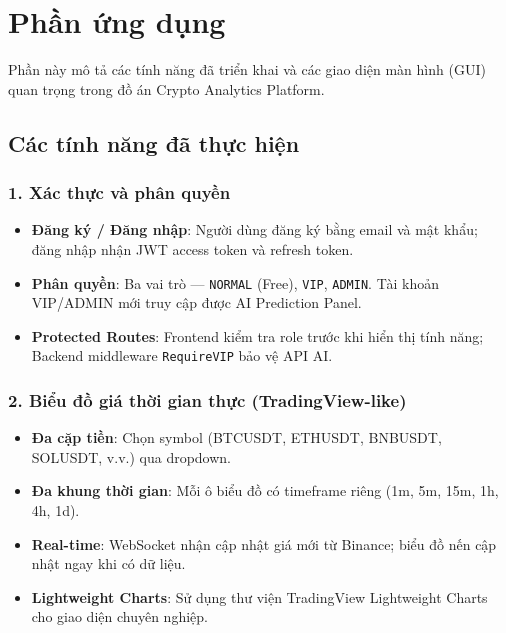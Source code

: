 
\section{Phần ứng dụng}
\label{sec:ung-dung}

Phần này mô tả các tính năng đã triển khai và các giao diện màn hình (GUI) quan trọng trong đồ án Crypto Analytics Platform.

\subsection{Các tính năng đã thực hiện}

\subsubsection{1. Xác thực và phân quyền}

\begin{itemize}
    \item \textbf{Đăng ký / Đăng nhập}: Người dùng đăng ký bằng email và mật khẩu; đăng nhập nhận JWT access token và refresh token.
    \item \textbf{Phân quyền}: Ba vai trò --- \texttt{NORMAL} (Free), \texttt{VIP}, \texttt{ADMIN}. Tài khoản VIP/ADMIN mới truy cập được AI Prediction Panel.
    \item \textbf{Protected Routes}: Frontend kiểm tra role trước khi hiển thị tính năng; Backend middleware \texttt{RequireVIP} bảo vệ API AI.
\end{itemize}

\subsubsection{2. Biểu đồ giá thời gian thực (TradingView-like)}

\begin{itemize}
    \item \textbf{Đa cặp tiền}: Chọn symbol (BTCUSDT, ETHUSDT, BNBUSDT, SOLUSDT, v.v.) qua dropdown.
    \item \textbf{Đa khung thời gian}: Mỗi ô biểu đồ có timeframe riêng (1m, 5m, 15m, 1h, 4h, 1d).
    \item \textbf{Real-time}: WebSocket nhận cập nhật giá mới từ Binance; biểu đồ nến cập nhật ngay khi có dữ liệu.
    \item \textbf{Lightweight Charts}: Sử dụng thư viện TradingView Lightweight Charts cho giao diện chuyên nghiệp.
\end{itemize}

